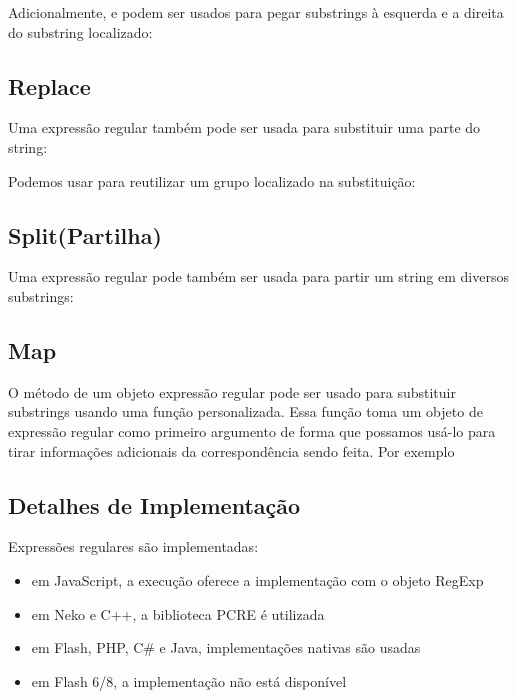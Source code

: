 {Adicionalmente,  e  podem ser usados para pegar substrings à esquerda e a direita do substring localizado:


\subsection{Replace}
\label{std-regex-replace}

Uma expressão regular também pode ser usada para substituir uma parte do string:


Podemos usar  para reutilizar um grupo localizado na substituição:


\subsection{Split(Partilha)}
\label{std-regex-split}

Uma expressão regular pode também ser usada para partir um string em diversos substrings:


\subsection{Map}
\label{std-regex-map}

O método  de um objeto expressão regular pode ser usado para substituir substrings usando uma função personalizada. Essa função toma um objeto de expressão regular como primeiro argumento de forma que possamos usá-lo para tirar informações adicionais da correspondência sendo feita. Por exemplo


\subsection{Detalhes de Implementação}
\label{std-regex-implementation-details}

Expressões regulares são implementadas:

\begin{itemize}
    \item em JavaScript, a execução oferece a implementação com o objeto RegExp
    \item em Neko e C++, a biblioteca PCRE é utilizada
    \item em Flash, PHP, C# e Java, implementações nativas são usadas
    \item em Flash 6/8, a implementação não está disponível
\end{itemize}

}
